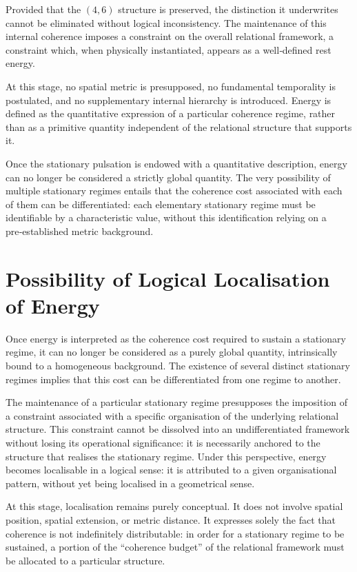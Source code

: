 \documentclass[11pt,a4paper]{article}
\begin{document}
Provided that the \((4,6)\) structure is preserved, the distinction it underwrites cannot be eliminated without logical inconsistency. The maintenance of this internal coherence imposes a constraint on the overall relational framework, a constraint which, when physically instantiated, appears as a well‑defined rest energy. 

At this stage, no spatial metric is presupposed, no fundamental temporality is postulated, and no supplementary internal hierarchy is introduced. Energy is defined as the quantitative expression of a particular coherence regime, rather than as a primitive quantity independent of the relational structure that supports it. 

Once the stationary pulsation is endowed with a quantitative description, energy can no longer be considered a strictly global quantity. The very possibility of multiple stationary regimes entails that the coherence cost associated with each of them can be differentiated: each elementary stationary regime must be identifiable by a characteristic value, without this identification relying on a pre‑established metric background.

\section{Possibility of Logical Localisation of Energy}
Once energy is interpreted as the coherence cost required to sustain a stationary regime, it can no longer be considered as a purely global quantity, intrinsically bound to a homogeneous background. The existence of several distinct stationary regimes implies that this cost can be differentiated from one regime to another. 

The maintenance of a particular stationary regime presupposes the imposition of a constraint associated with a specific organisation of the underlying relational structure. This constraint cannot be dissolved into an undifferentiated framework without losing its operational significance: it is necessarily anchored to the structure that realises the stationary regime. Under this perspective, energy becomes localisable in a logical sense: it is attributed to a given organisational pattern, without yet being localised in a geometrical sense. 

At this stage, localisation remains purely conceptual. It does not involve spatial position, spatial extension, or metric distance. It expresses solely the fact that coherence is not indefinitely distributable: in order for a stationary regime to be sustained, a portion of the “coherence budget” of the relational framework must be allocated to a particular structure.
\end{document}
